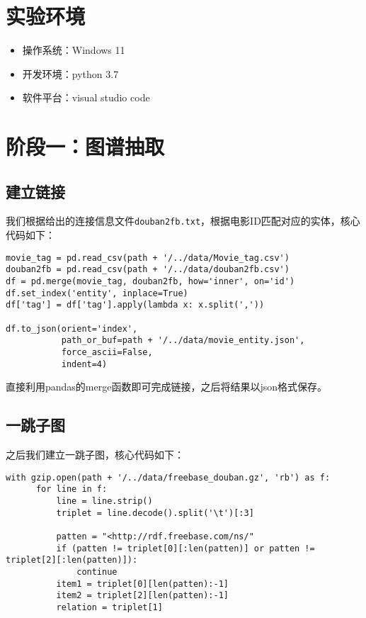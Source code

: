 \documentclass{ctexart}
\begin{document}
\begin{sloppypar}
\section{实验环境}

\begin{itemize}
      \item 操作系统：Windows 11
      \item 开发环境：python 3.7
      \item 软件平台：visual studio code
\end{itemize}

\section{阶段一：图谱抽取}
\subsection{建立链接}
我们根据给出的连接信息文件\texttt{douban2fb.txt}，根据电影ID匹配对应的实体，核心代码如下：

\begin{lstlisting}[style=Python]
movie_tag = pd.read_csv(path + '/../data/Movie_tag.csv')
douban2fb = pd.read_csv(path + '/../data/douban2fb.csv')
df = pd.merge(movie_tag, douban2fb, how='inner', on='id')
df.set_index('entity', inplace=True)
df['tag'] = df['tag'].apply(lambda x: x.split(','))

df.to_json(orient='index',
           path_or_buf=path + '/../data/movie_entity.json',
           force_ascii=False,
           indent=4)
\end{lstlisting}

直接利用pandas的merge函数即可完成链接，之后将结果以json格式保存。

\subsection{一跳子图}
之后我们建立一跳子图，核心代码如下：

\begin{lstlisting}[style=Python]
with gzip.open(path + '/../data/freebase_douban.gz', 'rb') as f:
      for line in f:
          line = line.strip()
          triplet = line.decode().split('\t')[:3]
  
          patten = "<http://rdf.freebase.com/ns/"
          if (patten != triplet[0][:len(patten)] or patten != triplet[2][:len(patten)]):
              continue
          item1 = triplet[0][len(patten):-1]
          item2 = triplet[2][len(patten):-1]
          relation = triplet[1]
  

\end{lstlisting}
\end{sloppypar}
\end{document}
